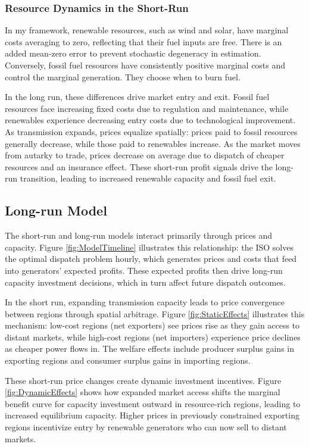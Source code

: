 \documentclass[12pt]{article}
\begin{document}
\subsubsection{Resource Dynamics in the Short-Run}

In my framework, renewable resources, such as wind and solar, have marginal costs averaging to zero, reflecting that their fuel inputs are free. There is an added mean-zero error to prevent stochastic degeneracy in estimation. Conversely, fossil fuel resources have consistently positive marginal costs and control the marginal generation. They choose when to burn fuel.

In the long run, these differences drive market entry and exit. Fossil fuel resources face increasing fixed costs due to regulation and maintenance, while renewables experience decreasing entry costs due to technological improvement. As transmission expands, prices equalize spatially: prices paid to fossil resources generally decrease, while those paid to renewables increase. As the market moves from autarky to trade, prices decrease on average due to dispatch of cheaper resources and an insurance effect. These short-run profit signals drive the long-run transition, leading to increased renewable capacity and fossil fuel exit.

\subsection{Long-run Model}

The short-run and long-run models interact primarily through prices and capacity. Figure \ref{fig:ModelTimeline} illustrates this relationship: the ISO solves the optimal dispatch problem hourly, which generates prices and costs that feed into generators' expected profits. These expected profits then drive long-run capacity investment decisions, which in turn affect future dispatch outcomes.

In the short run, expanding transmission capacity leads to price convergence between regions through spatial arbitrage. Figure \ref{fig:StaticEffects} illustrates this mechanism: low-cost regions (net exporters) see prices rise as they gain access to distant markets, while high-cost regions (net importers) experience price declines as cheaper power flows in. The welfare effects include producer surplus gains in exporting regions and consumer surplus gains in importing regions.

These short-run price changes create dynamic investment incentives. Figure \ref{fig:DynamicEffects} shows how expanded market access shifts the marginal benefit curve for capacity investment outward in resource-rich regions, leading to increased equilibrium capacity. Higher prices in previously constrained exporting regions incentivize entry by renewable generators who can now sell to distant markets.
\end{document}
